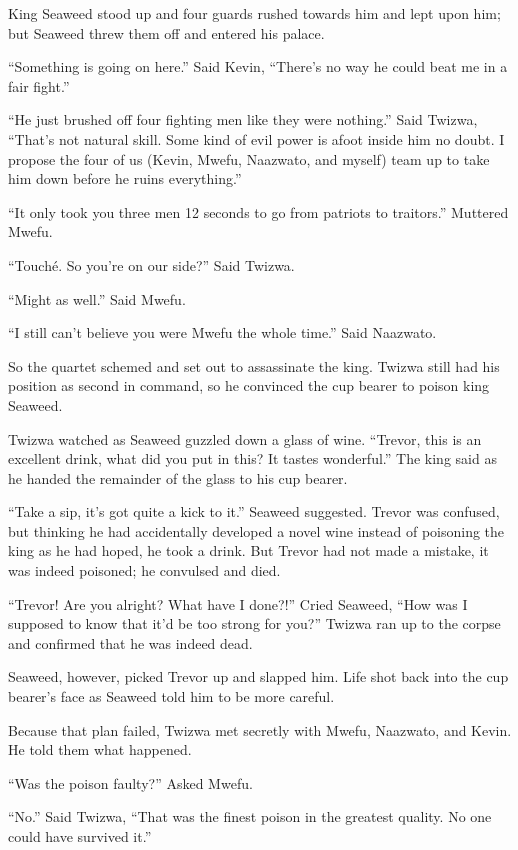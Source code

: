 King Seaweed stood up and four guards rushed towards him and lept upon him; but Seaweed threw them off and entered his palace.

``Something is going on here.'' Said Kevin, ``There's no way he could beat me in a fair fight.''

``He just brushed off four fighting men like they were nothing.'' Said Twizwa, ``That's not natural skill. Some kind of evil power is afoot inside him no doubt. I propose the four of us (Kevin, Mwefu, Naazwato, and myself) team up to take him down before he ruins everything.''

``It only took you three men 12 seconds to go from patriots to traitors.'' Muttered Mwefu.

``Touch\'{e}. So you're on our side?'' Said Twizwa.

``Might as well.'' Said Mwefu.

``I still can't believe you were Mwefu the whole time.'' Said Naazwato.

\tbreak

So the quartet schemed and set out to assassinate the king.
Twizwa still had his position as second in command, so he convinced the cup bearer to poison king Seaweed.

\tbreak

Twizwa watched as Seaweed guzzled down a glass of wine. ``Trevor, this is an excellent drink, what did you put in this? It tastes wonderful.'' The king said as he handed the remainder of the glass to his cup bearer.

``Take a sip, it's got quite a kick to it.'' Seaweed suggested. Trevor was confused, but thinking he had accidentally developed a novel wine instead of poisoning the king as he had hoped, he took a drink. But Trevor had not made a mistake, it was indeed poisoned; he convulsed and died. 

``Trevor! Are you alright? What have I done?!'' Cried Seaweed, ``How was I supposed to know that it'd be too strong for you?'' Twizwa ran up to the corpse and confirmed that he was indeed dead.

Seaweed, however, picked Trevor up and slapped him. Life shot back into the cup bearer's face as Seaweed told him to be more careful. 

Because that plan failed, Twizwa met secretly with Mwefu, Naazwato, and Kevin. He told them what happened.

``Was the poison faulty?'' Asked Mwefu.

``No.'' Said Twizwa, ``That was the finest poison in the greatest quality. No one could have survived it.'' 


